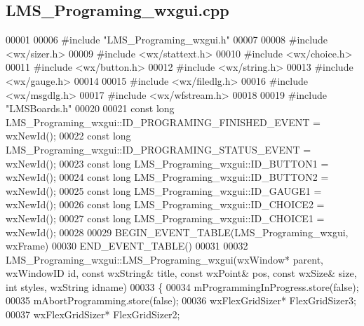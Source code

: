 \subsection{L\+M\+S\+\_\+\+Programing\+\_\+wxgui.\+cpp}
\label{LMS__Programing__wxgui_8cpp_source}

\begin{DoxyCode}
00001 
00006 \textcolor{preprocessor}{#include "LMS_Programing_wxgui.h"}
00007 
00008 \textcolor{preprocessor}{#include <wx/sizer.h>}
00009 \textcolor{preprocessor}{#include <wx/stattext.h>}
00010 \textcolor{preprocessor}{#include <wx/choice.h>}
00011 \textcolor{preprocessor}{#include <wx/button.h>}
00012 \textcolor{preprocessor}{#include <wx/string.h>}
00013 \textcolor{preprocessor}{#include <wx/gauge.h>}
00014 
00015 \textcolor{preprocessor}{#include <wx/filedlg.h>}
00016 \textcolor{preprocessor}{#include <wx/msgdlg.h>}
00017 \textcolor{preprocessor}{#include <wx/wfstream.h>}
00018 
00019 \textcolor{preprocessor}{#include "LMSBoards.h"}
00020 
00021 \textcolor{keyword}{const} \textcolor{keywordtype}{long} LMS_Programing_wxgui::ID_PROGRAMING_FINISHED_EVENT = wxNewId();
00022 \textcolor{keyword}{const} \textcolor{keywordtype}{long} LMS_Programing_wxgui::ID_PROGRAMING_STATUS_EVENT = wxNewId();
00023 \textcolor{keyword}{const} \textcolor{keywordtype}{long} LMS_Programing_wxgui::ID_BUTTON1 = wxNewId();
00024 \textcolor{keyword}{const} \textcolor{keywordtype}{long} LMS_Programing_wxgui::ID_BUTTON2 = wxNewId();
00025 \textcolor{keyword}{const} \textcolor{keywordtype}{long} LMS_Programing_wxgui::ID_GAUGE1 = wxNewId();
00026 \textcolor{keyword}{const} \textcolor{keywordtype}{long} LMS_Programing_wxgui::ID_CHOICE2 = wxNewId();
00027 \textcolor{keyword}{const} \textcolor{keywordtype}{long} LMS_Programing_wxgui::ID_CHOICE1 = wxNewId();
00028 
00029 BEGIN\_EVENT\_TABLE(LMS_Programing_wxgui, wxFrame)
00030 END\_EVENT\_TABLE()
00031 
00032 LMS_Programing_wxgui::LMS_Programing_wxgui(wxWindow* parent, wxWindowID \textcolor{keywordtype}{id}, const wxString& title, const 
      wxPoint& pos, const wxSize& size, \textcolor{keywordtype}{int} styles, wxString idname)
00033 \{
00034     mProgrammingInProgress.store(\textcolor{keyword}{false});
00035     mAbortProgramming.store(\textcolor{keyword}{false});
00036     wxFlexGridSizer* FlexGridSizer3;
00037     wxFlexGridSizer* FlexGridSizer2;

\end{DoxyCode}
